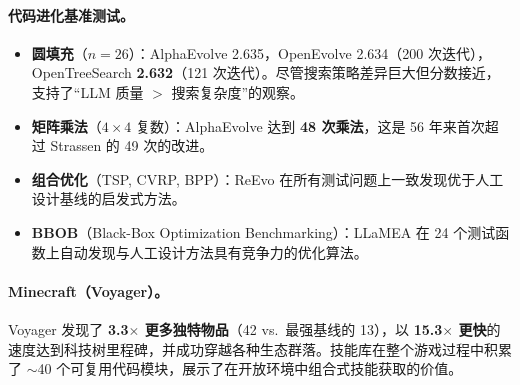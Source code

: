 \paragraph{代码进化基准测试。}
\begin{itemize}
    \item \textbf{圆填充}（$n=26$）：AlphaEvolve 2.635，OpenEvolve 2.634（200 次迭代），OpenTreeSearch \textbf{2.632}（121 次迭代）。尽管搜索策略差异巨大但分数接近，支持了``LLM 质量 $>$ 搜索复杂度''的观察。
    \item \textbf{矩阵乘法}（$4\times 4$ 复数）：AlphaEvolve 达到 \textbf{48 次乘法}，这是 56 年来首次超过 Strassen 的 49 次的改进。
    \item \textbf{组合优化}（TSP, CVRP, BPP）：ReEvo 在所有测试问题上一致发现优于人工设计基线的启发式方法。
    \item \textbf{BBOB}（Black-Box Optimization Benchmarking）：LLaMEA 在 24 个测试函数上自动发现与人工设计方法具有竞争力的优化算法。
\end{itemize}

\paragraph{Minecraft（Voyager）。}
Voyager 发现了 \textbf{3.3$\times$ 更多独特物品}（42 vs.\ 最强基线的 13），以 \textbf{15.3$\times$ 更快}的速度达到科技树里程碑，并成功穿越各种生态群落。技能库在整个游戏过程中积累了 $\sim$40 个可复用代码模块，展示了在开放环境中组合式技能获取的价值。

